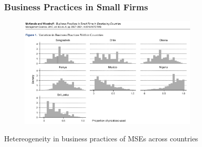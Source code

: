 \documentclass[hideothersubsections, usenames,dvipsnames,11pt]{beamer}
\newenvironment{itemize_2pt}{\itemize\addtolength{\itemsep}{2pt}}{\enditemize}
\begin{document}
\begin{frame}
\frametitle{Business Practices in Small Firms}

\begin{figure}[htbp]
	\centering
	\includegraphics[width=23em]{pics/McKenzie2017_het.png}
	\label{McKenzie(2017): Heterogeneity}
\end{figure}

\begin{itemize_2pt}
	\item Hetereogeneity in business practices of MSEs across countries \citep{McKenzie2017}
\end{itemize_2pt}
\end{frame}
\end{document}
